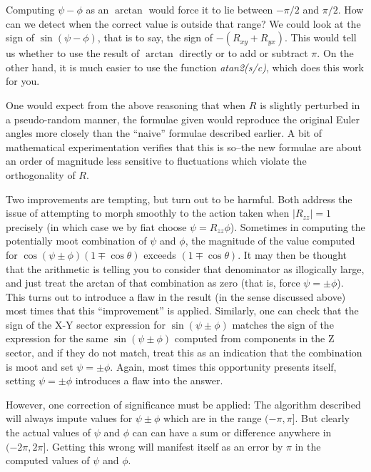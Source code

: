 Computing $\psi - \phi $ as an $\arctan$ would force it to lie between $-\pi/2$
and $\pi/2$.  How can we detect when the correct value is outside that range?
We could look at the sign of $\sin (\psi - \phi)$, 
that is to say, the sign of $-(R_{xy} + R_{yx})$.  This would tell us
whether to use the result of $\arctan$ directly or to add or subtract $\pi$.
On the other hand, it is much easier to use the function {\em atan2(s/c)},
which does this work for you.

One would expect from the above reasoning that when $R$ is slightly perturbed
in a pseudo-random manner,
the formulae given would reproduce the original Euler angles more closely than 
the ``naive'' formulae described earlier.  A bit of mathematical experimentation
verifies that this is so--the new formulae are about an order of magnitude
less sensitive to fluctuations which violate the orthogonality of $R$.

Two improvements are tempting, but turn out to be harmful.  Both address the
issue of attempting to morph smoothly to the action taken when $|R_{zz}| = 1$
precisely (in which case we by fiat choose $\psi = R_{zz} \phi$).   Sometimes
in computing the potentially moot combination of $\psi$ and $\phi$, 
the magnitude of the value computed for 
$\cos (\psi \pm \phi) (1 \mp \cos \theta)$ exceeds $(1 \mp \cos \theta)$.  
It may then be thought that the arithmetic is telling you to consider that 
denominator as illogically large, and just treat the arctan of that 
combination as zero (that is, force $\psi = \pm \phi$).  This turns out to
introduce a flaw in the result (in the sense discussed above) most times that
this ``improvement'' is applied.  Similarly, one can check that the sign of the 
X-Y sector expression for $\sin(\psi \pm \phi)$ matches the sign of the
expression for the same $\sin(\psi \pm \phi)$ computed from components in the Z
sector, and if they do not match, treat this as an indication that the
combination is moot and set $\psi = \pm \phi$.  Again, most times this
opportunity presents itself, setting $\psi = \pm \phi$ introduces a flaw 
into the answer.  

However, one correction of significance must be applied:
The algorithm described will always impute values for $\psi \pm \phi$ 
which are in the range $(-\pi,\pi]$.  But clearly the actual values of 
$\psi$ and $\phi$ can can have a sum or difference anywhere in $(-2\pi,2\pi]$.
Getting this wrong will manifest itself as an error by $\pi$ in the
computed values of $\psi$ and $\phi$.

